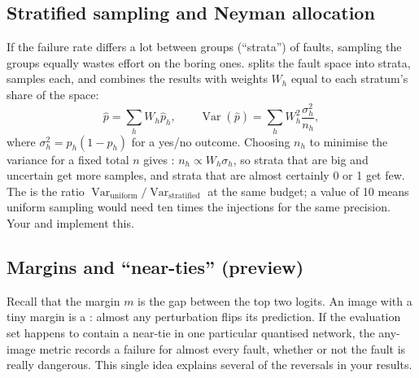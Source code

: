 \subsection{Stratified sampling and Neyman allocation}
If the failure rate differs a lot between groups (``strata'') of faults, sampling the groups equally wastes effort on the boring ones.
 splits the fault space into strata, samples each, and combines the results with weights $W_h$ equal to each stratum's share of the space:
\[
\hat p=\sum_h W_h\hat p_h,\qquad \operatorname{Var}(\hat p)=\sum_h W_h^{2}\frac{\sigma_h^{2}}{n_h},
\]
where $\sigma_h^2=p_h(1-p_h)$ for a yes/no outcome. Choosing $n_h$ to minimise the variance for a fixed total $n$ gives
: $n_h\propto W_h\sigma_h$, so strata that are big and uncertain get more samples, and strata that are almost
certainly 0 or 1 get few. The  is the ratio $\operatorname{Var}_{\text{uniform}}/\operatorname{Var}_{\text{stratified}}$ at the same budget; a value of 10
means uniform sampling would need ten times the injections for the same precision. Your  and 
implement this.

\subsection{Margins and ``near-ties'' (preview)}
Recall that the margin $m$ is the gap between the top two logits. An image with a tiny margin is a : almost any perturbation flips its
prediction. If the evaluation set happens to contain a near-tie in one particular quantised network, the any-image metric records
a failure for almost every fault, whether or not the fault is really dangerous. This single idea explains several of the reversals in
your results.
